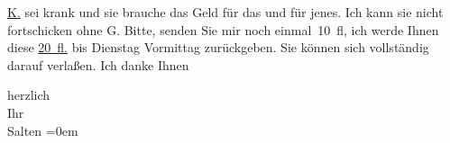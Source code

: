                   \uline{K.} sei krank und sie brauche das Geld für das und für jenes. Ich kann sie nicht
               fortschicken ohne G. Bitte, senden Sie mir noch einmal 10 fl, ich {\pb}werde Ihnen diese \uline{20 fl.} bis Dienstag{ }Vormittag{ } zurückgeben. Sie können sich vollständig
               darauf verlaßen. Ich danke Ihnen\pend
           
\pstart
           herzlich {\\[\baselineskip]}Ihr {\\[\baselineskip]}\spacefill\mbox{Salten}\pend
           \leftskip=0em{}\endnumbering{}  \newcommand{\dateiname}{L03156}\newcommand{\titel}{Felix Salten an Arthur Schnitzler, [9. 6. 1895]}\newcommand{\editorInnen}{Martin Anton Müller und Laura Untner}
